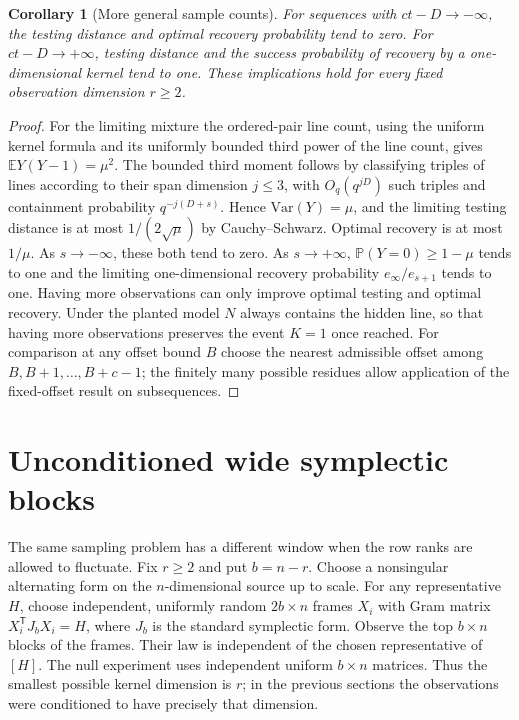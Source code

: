\documentclass[11pt]{article}
\newtheorem{corollary}[theorem]{Corollary}
\newcommand{\PP}{\mathbb P}
\newcommand{\E}{\mathbb E}
\begin{document}
\begin{corollary}[More general sample counts]
For sequences with $ct-D\to-\infty$, the testing distance and optimal recovery probability tend to zero. For $ct-D\to+\infty$, testing distance and the success probability of recovery by a one-dimensional kernel tend to one. These implications hold for every fixed observation dimension $r\ge2$.
\end{corollary}
\begin{proof}
For the limiting mixture the ordered-pair line count, using the uniform kernel formula and its uniformly bounded third power of the line count, gives $\E Y(Y-1)=\mu^2$. The bounded third moment follows by classifying triples of lines according to their span dimension $j\le3$, with $O_q(q^{jD})$ such triples and containment probability $q^{-j(D+s)}$. Hence $\mathrm{Var}(Y)=\mu$, and the limiting testing distance is at most $1/(2\sqrt\mu)$ by Cauchy--Schwarz. Optimal recovery is at most $1/\mu$. As $s\to-\infty$, these both tend to zero. As $s\to+\infty$, $\PP(Y=0)\ge1-\mu$ tends to one and the limiting one-dimensional recovery probability $e_\infty/e_{s+1}$ tends to one. Having more observations can only improve optimal testing and optimal recovery. Under the planted model $N$ always contains the hidden line, so that having more observations preserves the event $K=1$ once reached. For comparison at any offset bound $B$ choose the nearest admissible offset among $B,B+1,\ldots,B+c-1$; the finitely many possible residues allow application of the fixed-offset result on subsequences.
\end{proof}

\section{Unconditioned wide symplectic blocks}
The same sampling problem has a different window when the row ranks are allowed to fluctuate. Fix $r\ge2$ and put $b=n-r$. Choose a nonsingular alternating form on the $n$-dimensional source up to scale. For any representative $H$, choose independent, uniformly random $2b\times n$ frames $X_i$ with Gram matrix $X_i^{\mathsf T}J_bX_i=H$, where $J_b$ is the standard symplectic form. Observe the top $b\times n$ blocks of the frames. Their law is independent of the chosen representative of $[H]$. The null experiment uses independent uniform $b\times n$ matrices. Thus the smallest possible kernel dimension is $r$; in the previous sections the observations were conditioned to have precisely that dimension.
\end{document}
